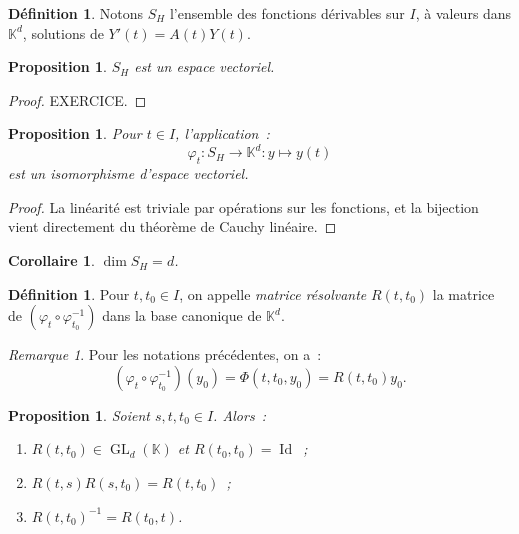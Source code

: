 \documentclass{report}
\newtheorem{prp}[thm]{Proposition}
\newtheorem{cor}[thm]{Corollaire}
\theoremstyle{definition}
\newtheorem{déf}[thm]{Définition}
\theoremstyle{remark}
\newtheorem*{rmq}{Remarque}
\numberwithin{equation}{section}
\newcommand{\K}{\mathbb K}
\DeclareMathOperator{\GL}{GL}
\DeclareMathOperator{\Id}{Id}
\begin{document}
		\begin{déf} Notons $S_H$ l'ensemble des fonctions dérivables sur $I$, à valeurs dans $\K^d$, solutions de $Y'(t) = A(t)Y(t)$.
		\end{déf}

		\begin{prp} $S_H$ est un espace vectoriel.
		\end{prp}

		\begin{proof} EXERCICE.
		\end{proof}

		\begin{prp} Pour $t \in I$, l'application~:
		\begin{equation}
			\varphi_t : S_H \to \K^d : y \mapsto y(t)
		\end{equation}
		est un isomorphisme d'espace vectoriel.
		\end{prp}

		\begin{proof} La linéarité est triviale par opérations sur les fonctions, et la bijection vient directement du théorème de Cauchy linéaire.
		\end{proof}

		\begin{cor} $\dim S_H = d$.
		\end{cor}

		\begin{déf} Pour $t, t_0 \in I$, on appelle \textit{matrice résolvante} $R(t, t_0)$ la matrice de $(\varphi_t \circ \varphi_{t_0}^{-1})$ dans la base
		canonique de $\K^d$.
		\end{déf}

		\begin{rmq} Pour les notations précédentes, on a~:
		\begin{equation}
			(\varphi_t \circ \varphi_{t_0}^{-1})(y_0) = \Phi(t, t_0, y_0) = R(t, t_0)y_0.
		\end{equation}
		\end{rmq}

		\begin{prp} Soient $s, t, t_0 \in I$. Alors~:
		\begin{enumerate}
			\item $R(t, t_0) \in \GL_d(\K)$ et $R(t_0, t_0) = \Id$~;
			\item $R(t, s)R(s, t_0) = R(t, t_0)$~;
			\item $R(t, t_0)^{-1} = R(t_0, t)$.
		\end{enumerate}
		\end{prp}
\end{document}

